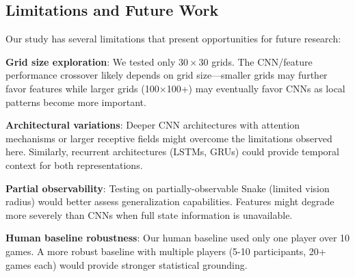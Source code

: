 \documentclass[10pt,a4paper,twocolumn]{article}
\begin{document}
\subsection{Limitations and Future Work}

Our study has several limitations that present opportunities for future research:

\textbf{Grid size exploration}: We tested only $30 \times 30$ grids. The CNN/feature performance crossover likely depends on grid size---smaller grids may further favor features while larger grids (100×100+) may eventually favor CNNs as local patterns become more important.

\textbf{Architectural variations}: Deeper CNN architectures with attention mechanisms or larger receptive fields might overcome the limitations observed here. Similarly, recurrent architectures (LSTMs, GRUs) could provide temporal context for both representations.

\textbf{Partial observability}: Testing on partially-observable Snake (limited vision radius) would better assess generalization capabilities. Features might degrade more severely than CNNs when full state information is unavailable.

\textbf{Human baseline robustness}: Our human baseline used only one player over 10 games. A more robust baseline with multiple players (5-10 participants, 20+ games each) would provide stronger statistical grounding.
\end{document}
